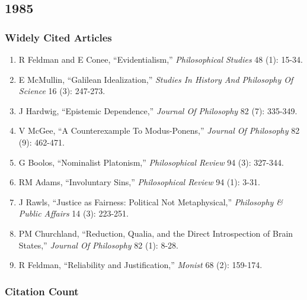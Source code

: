 \documentclass[
  10pt,
  letterpaper,
  DIV=11,
  numbers=noendperiod,
  twoside]{scrartcl}
\providecommand{\tightlist}{%
  \setlength{\itemsep}{0pt}\setlength{\parskip}{0pt}}\usepackage{longtable,booktabs,array}
\begin{document}
\newpage

\subsection{1985}\label{sec-s1985}

\subsubsection*{Widely Cited Articles}\label{widely-cited-articles-9}

\begin{enumerate}
\def\labelenumi{\arabic{enumi}.}
\tightlist
\item
  R Feldman and E Conee, ``Evidentialism,'' \emph{Philosophical Studies}
  48 (1): 15-34.
\item
  E McMullin, ``Galilean Idealization,'' \emph{Studies In History And
  Philosophy Of Science} 16 (3): 247-273.
\item
  J Hardwig, ``Epistemic Dependence,'' \emph{Journal Of Philosophy} 82
  (7): 335-349.
\item
  V McGee, ``A Counterexample To Modus-Ponens,'' \emph{Journal Of
  Philosophy} 82 (9): 462-471.
\item
  G Boolos, ``Nominalist Platonism,'' \emph{Philosophical Review} 94
  (3): 327-344.
\item
  RM Adams, ``Involuntary Sins,'' \emph{Philosophical Review} 94 (1):
  3-31.
\item
  J Rawls, ``Justice as Fairness: Political Not Metaphysical,''
  \emph{Philosophy \& Public Affairs} 14 (3): 223-251.
\item
  PM Churchland, ``Reduction, Qualia, and the Direct Introspection of
  Brain States,'' \emph{Journal Of Philosophy} 82 (1): 8-28.
\item
  R Feldman, ``Reliability and Justification,'' \emph{Monist} 68 (2):
  159-174.
\end{enumerate}

\subsubsection*{Citation Count}\label{sec-count-1985}
\end{document}
